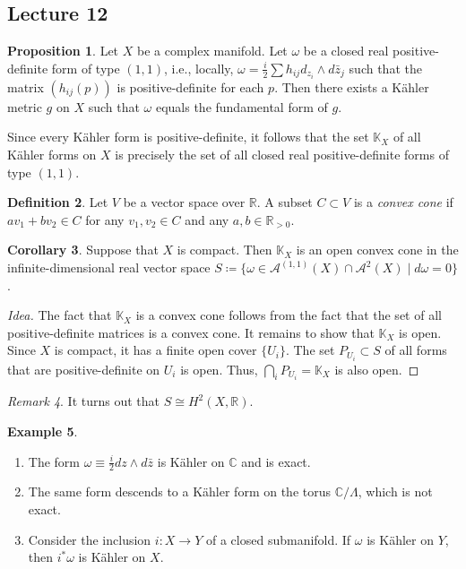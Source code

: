 \documentclass[10pt,letterpaper,cm]{nupset}
\theoremstyle{definition}
\newtheorem{defn}{Definition}[subsection]
\newtheorem{exmp}[defn]{Example}
\theoremstyle{theorem}
\newtheorem{prop}[defn]{Proposition}
\newtheorem{corollary}[defn]{Corollary}
\theoremstyle{remark}
\newtheorem{remark}[defn]{Remark}
\newcommand{\A}{\mathcal A}
\newcommand{\C}{\mathbb C}
\newcommand{\K}{\mathbb K}
\newcommand{\R}{\mathbb{R}}
\newcommand{\1}{\mathbb{1}}
\newcommand{\0}{\vec 0}
\newcommand{\be}{\begin{enumerate}}
\newcommand{\ee}{\end{enumerate}}
\begin{document}
\subsection{Lecture 12}

\begin{prop}
Let $X$ be a complex manifold. Let $\omega$ be a closed real positive-definite form of type $\left(1,1\right)$, i.e., locally, $\omega = \frac{i}{2}\sum h_{ij}d_{z_i}\wedge d{\bar{z}_j}$ such that the matrix $\left(h_{ij}(p)\right)$ is positive-definite for each $p$. Then there exists a K\"ahler metric $g$ on $X$ such that $\omega$ equals the fundamental form of $g$. 
\end{prop}

Since every K\"ahler form is positive-definite, it follows that the set $\K_X$ of all K\"ahler forms on $X$ is precisely the set of all closed real positive-definite forms of type $\left(1,1\right)$.

\begin{defn}
Let $V$ be a vector space over $\R$. A subset $C\subset V$ is a \textit{convex cone} if $av_1 + bv_2 \in C$ for any $v_1, v_2\in C$ and any $a,b\in \R_{>0}$.
\end{defn}

\begin{corollary}
Suppose that $X$ is compact. Then $\K_X$ is an open convex cone in the infinite-dimensional real vector space $S\coloneqq \{\omega \in \A^{(1,1)}\left(X\right) \cap \A^2\left(X\right) \mid d{\omega} =0\}$.
\end{corollary}
\begin{proof}[Idea]
The fact that $\K_X$ is a convex cone follows from the fact that the set of all positive-definite matrices is a convex cone. It remains to show that $\K_X$ is open. Since $X$ is compact, it has a finite open cover $\{U_i\}$. The set $P_{U_i}\subset S$ of all  forms that are positive-definite on $U_i$ is open. Thus, $\bigcap_i P_{U_i} = \K_X$  is also open.
\end{proof}

\begin{remark}
It turns out that $S \cong H^2\left(X, \R\right)$.
\end{remark}

\begin{exmp}\label{km1} $ $
\be
\item The form $\omega \equiv \frac{i}{2}d{z} \wedge d{\bar{z}}$ is K\"ahler on $\C$ and is exact.
\item The same form descends to a K\"ahler form on the torus $\C/\Lambda$, which is not exact. 
\item Consider the inclusion $i : X \to Y$ of a closed submanifold. If $\omega$ is K\"ahler on $Y$, then $i^{\ast}{\omega}$ is K\"ahler on $X$.
\ee
\end{exmp}
\end{document}

